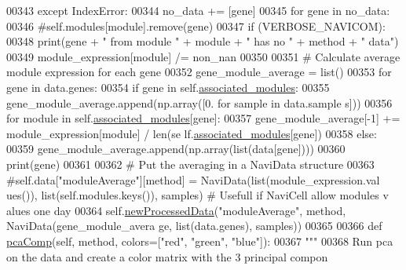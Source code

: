 \begin{DoxyCode}
00343                 \textcolor{keywordflow}{except} IndexError:
00344                     no\_data += [gene]
00345             \textcolor{keywordflow}{for} gene \textcolor{keywordflow}{in} no\_data:
00346                 \textcolor{comment}{#self.modules[module].remove(gene)}
00347                 \textcolor{keywordflow}{if} (VERBOSE\_NAVICOM):
00348                     \textcolor{keywordflow}{print}(gene + \textcolor{stringliteral}{" from module "} + module + \textcolor{stringliteral}{" has no "} + method +
       \textcolor{stringliteral}{" data"})
00349             module\_expression[module] /= non\_nan
00350 
00351         \textcolor{comment}{# Calculate average module expression for each gene}
00352         gene\_module\_average = list()
00353         \textcolor{keywordflow}{for} gene \textcolor{keywordflow}{in} data.genes:
00354             \textcolor{keywordflow}{if} gene \textcolor{keywordflow}{in} self.\hyperlink{classnavicom_1_1navicom_1_1NaviCom_a9f3e4dbfabe319967c14bf61eaf8d022}{associated_modules}:
00355                 gene\_module\_average.append(np.array([0. \textcolor{keywordflow}{for} sample \textcolor{keywordflow}{in} data.sample
      s]))
00356                 \textcolor{keywordflow}{for} module \textcolor{keywordflow}{in} self.\hyperlink{classnavicom_1_1navicom_1_1NaviCom_a9f3e4dbfabe319967c14bf61eaf8d022}{associated_modules}[gene]:
00357                     gene\_module\_average[-1] += module\_expression[module] / len(se
      lf.\hyperlink{classnavicom_1_1navicom_1_1NaviCom_a9f3e4dbfabe319967c14bf61eaf8d022}{associated_modules}[gene])
00358             \textcolor{keywordflow}{else}:
00359                 gene\_module\_average.append(np.array(list(data[gene])))
00360                 \textcolor{keywordflow}{print}(gene)
00361 
00362         \textcolor{comment}{# Put the averaging in a NaviData structure}
00363         \textcolor{comment}{#self.data["moduleAverage"][method] = NaviData(list(module\_expression.val
      ues()), list(self.modules.keys()), samples) # Usefull if NaviCell allow modules v
      alues one day}
00364         self.\hyperlink{classnavicom_1_1navicom_1_1NaviCom_a42c3198667c80bbf3d61a3d57b39a883}{newProcessedData}(\textcolor{stringliteral}{"moduleAverage"}, method, NaviData(gene\_module\_avera
      ge, list(data.genes), samples))
00365 
00366     \textcolor{keyword}{def }\hyperlink{classnavicom_1_1navicom_1_1NaviCom_a369bba5d2dc39a565880bc6f853f0da1}{pcaComp}(self, method, colors=["red", "green", "blue"]):
00367         \textcolor{stringliteral}{"""}
00368 \textcolor{stringliteral}{        Run pca on the data and create a color matrix with the 3 principal compon
}
\end{DoxyCode}
